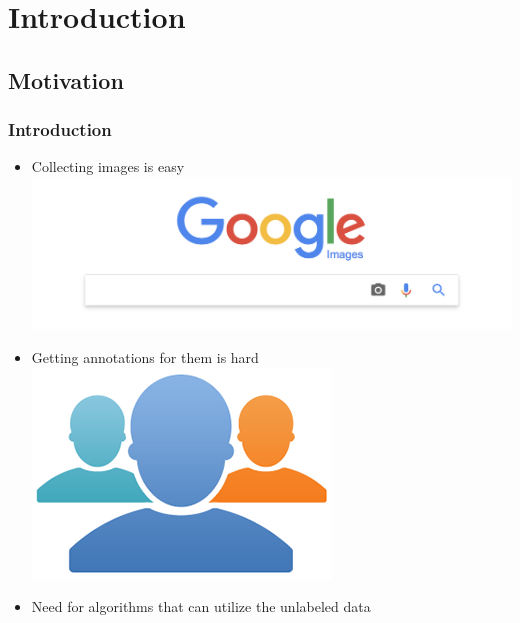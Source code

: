 \section{Introduction}

\subsection{Motivation}
\begin{frame}
	\frametitle{Introduction}
	\begin{itemize}
		\item Collecting images is easy\\
			\includegraphics[scale=0.16, center]{images/google}
		\item Getting annotations for them is hard\\
			\includegraphics[scale=0.16, center]{images/amt}
		\item Need for algorithms that can utilize the unlabeled data
			\begin{figure}
				~~
				~~
			\end{figure}
	\end{itemize}
\end{frame}


